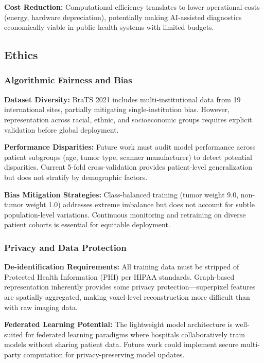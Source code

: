 \textbf{Cost Reduction:} Computational efficiency translates to lower operational costs (energy, hardware depreciation), potentially making AI-assisted diagnostics economically viable in public health systems with limited budgets.


\subsection{Ethics}

\subsubsection{Algorithmic Fairness and Bias}

\textbf{Dataset Diversity:} BraTS 2021 includes multi-institutional data from 19 international sites, partially mitigating single-institution bias. However, representation across racial, ethnic, and socioeconomic groups requires explicit validation before global deployment.

\textbf{Performance Disparities:} Future work must audit model performance across patient subgroups (age, tumor type, scanner manufacturer) to detect potential disparities. Current 5-fold cross-validation provides patient-level generalization but does not stratify by demographic factors.

\textbf{Bias Mitigation Strategies:} Class-balanced training (tumor weight 9.0, non-tumor weight 1.0) addresses extreme imbalance but does not account for subtle population-level variations. Continuous monitoring and retraining on diverse patient cohorts is essential for equitable deployment.

\subsubsection{Privacy and Data Protection}

\textbf{De-identification Requirements:} All training data must be stripped of Protected Health Information (PHI) per HIPAA standards. Graph-based representation inherently provides some privacy protection—superpixel features are spatially aggregated, making voxel-level reconstruction more difficult than with raw imaging data.

\textbf{Federated Learning Potential:} The lightweight model architecture is well-suited for federated learning paradigms where hospitals collaboratively train models without sharing patient data. Future work could implement secure multi-party computation for privacy-preserving model updates.

